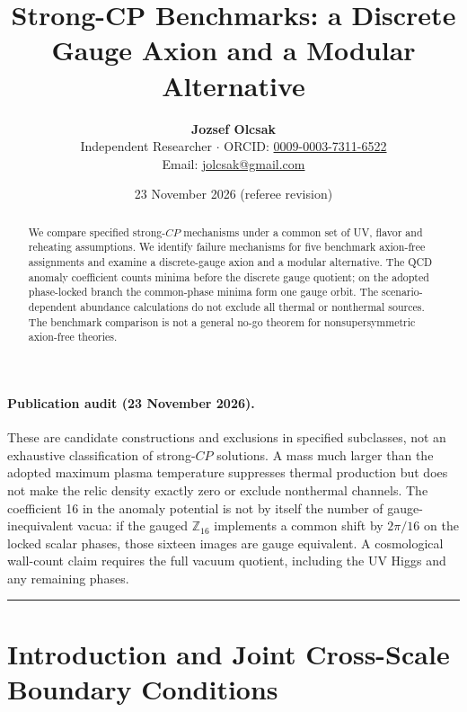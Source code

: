 \documentclass[11pt,a4paper]{article}
\title{Strong-CP Benchmarks: a Discrete Gauge Axion and a Modular Alternative}
\author{\textbf{Jozsef Olcsak}\\
\small Independent Researcher $\cdot$ ORCID: \href{https://orcid.org/0009-0003-7311-6522}{0009-0003-7311-6522}\\
\small Email: \href{mailto:jolcsak@gmail.com}{jolcsak@gmail.com}}
\date{23 November 2026 (referee revision)}
\begin{document}
\maketitle

\begin{abstract}
\noindent We compare specified strong-$CP$ mechanisms under a common set of UV, flavor and reheating assumptions. We identify failure mechanisms for five benchmark axion-free assignments and examine a discrete-gauge axion and a modular alternative. The QCD anomaly coefficient counts minima before the discrete gauge quotient; on the adopted phase-locked branch the common-phase minima form one gauge orbit. The scenario-dependent abundance calculations do not exclude all thermal or nonthermal sources. The benchmark comparison is not a general no-go theorem for nonsupersymmetric axion-free theories.
\end{abstract}

\paragraph{Publication audit (23 November 2026).}
These are candidate constructions and exclusions in specified subclasses,
not an exhaustive classification of strong-$CP$ solutions. A mass much
larger than the adopted maximum plasma temperature suppresses thermal
production but does not make the relic density exactly zero or exclude
nonthermal channels. The coefficient 16 in the anomaly potential is
not by itself the number of gauge-inequivalent vacua: if the gauged
$\mathbb{Z}_{16}$ implements a common shift by $2\pi/16$ on the locked
scalar phases, those sixteen images are gauge equivalent. A cosmological
wall-count claim requires the full vacuum quotient, including the UV
Higgs and any remaining phases.


\tableofcontents
\vspace{0.4em}
\hrule
\vspace{0.8em}

\section{Introduction and Joint Cross-Scale Boundary Conditions}
\label{sec:intro}
\end{document}
